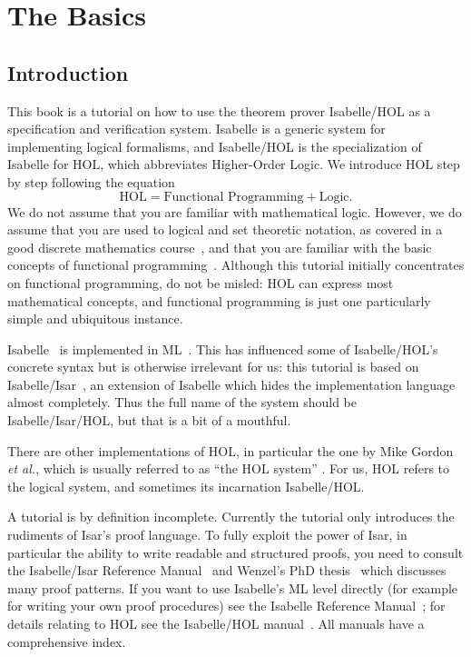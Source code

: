 \chapter{The Basics}

\section{Introduction}

This book is a tutorial on how to use the theorem prover Isabelle/HOL as a
specification and verification system. Isabelle is a generic system for
implementing logical formalisms, and Isabelle/HOL is the specialization
of Isabelle for HOL, which abbreviates Higher-Order Logic. We introduce
HOL step by step following the equation
\[ \mbox{HOL} = \mbox{Functional Programming} + \mbox{Logic}. \]
We do not assume that you are familiar with mathematical logic. 
However, we do assume that
you are used to logical and set theoretic notation, as covered
in a good discrete mathematics course~\cite{Rosen-DMA}, and
that you are familiar with the basic concepts of functional
programming~\cite{Bird-Haskell,Hudak-Haskell,paulson-ml2,Thompson-Haskell}.
Although this tutorial initially concentrates on functional programming, do
not be misled: HOL can express most mathematical concepts, and functional
programming is just one particularly simple and ubiquitous instance.

Isabelle~\cite{paulson-isa-book} is implemented in ML~\cite{SML}.  This has
influenced some of Isabelle/HOL's concrete syntax but is otherwise irrelevant
for us: this tutorial is based on
Isabelle/Isar~\cite{isabelle-isar-ref}, an extension of Isabelle which hides
the implementation language almost completely.  Thus the full name of the
system should be Isabelle/Isar/HOL, but that is a bit of a mouthful.

There are other implementations of HOL, in particular the one by Mike Gordon
%
\emph{et al.}, which is usually referred to as ``the HOL system''
\cite{mgordon-hol}. For us, HOL refers to the logical system, and sometimes
its incarnation Isabelle/HOL\@.

A tutorial is by definition incomplete.  Currently the tutorial only
introduces the rudiments of Isar's proof language. To fully exploit the power
of Isar, in particular the ability to write readable and structured proofs,
you need to consult the Isabelle/Isar Reference
Manual~\cite{isabelle-isar-ref} and Wenzel's PhD thesis~\cite{Wenzel-PhD}
which discusses many proof patterns. If you want to use Isabelle's ML level
directly (for example for writing your own proof procedures) see the Isabelle
Reference Manual~\cite{isabelle-ref}; for details relating to HOL see the
Isabelle/HOL manual~\cite{isabelle-HOL}. All manuals have a comprehensive
index.

